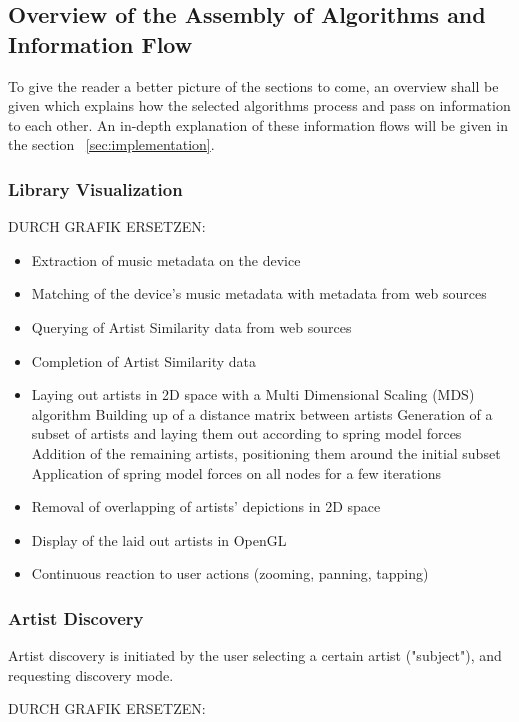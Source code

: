 \subsection{Overview of the Assembly of Algorithms and Information Flow}

To give the reader a better picture of the sections to come, an overview shall be given which explains how the selected algorithms process and pass on information to each other. An in-depth explanation of these information flows will be given in the section ~\ref{sec:implementation}.

\subsubsection{Library Visualization}

DURCH GRAFIK ERSETZEN:

\begin{itemize}
	\item Extraction of music metadata on the device
	\item Matching of the device's music metadata with metadata from web sources
	\item Querying of Artist Similarity data from web sources
	\item Completion of Artist Similarity data
	\item Laying out artists in 2D space with a Multi Dimensional Scaling (MDS) algorithm
		\subitem Building up of a distance matrix between artists
		\subitem Generation of a subset of artists and laying them out according to spring model forces
		\subitem Addition of the remaining artists, positioning them around the initial subset
		\subitem Application of spring model forces on all nodes for a few iterations
	\item Removal of overlapping of artists' depictions in 2D space
	\item Display of the laid out artists in OpenGL
	\item Continuous reaction to user actions (zooming, panning, tapping) 
\end{itemize}

\subsubsection{Artist Discovery}

Artist discovery is initiated by the user selecting a certain artist ("subject"), and requesting discovery mode.

DURCH GRAFIK ERSETZEN:

